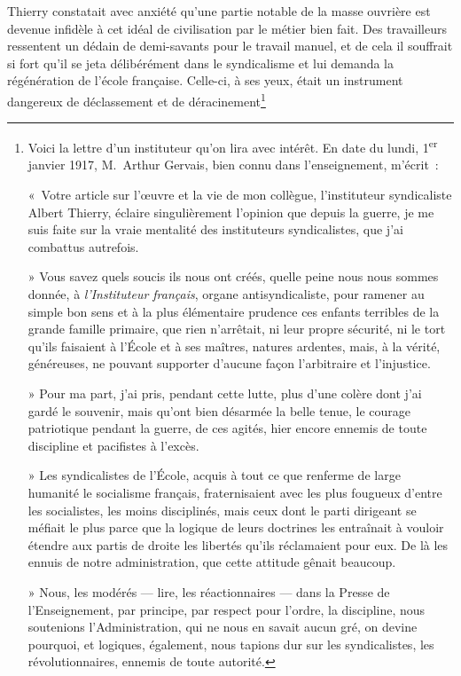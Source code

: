 \documentclass[french,twoside]{book} %
\begin{document}
Thierry constatait avec anxiété qu’une partie notable de la masse ouvrière est devenue infidèle à cet idéal de civilisation par le métier bien fait. Des travailleurs ressentent un dédain de demi-savants pour le travail manuel, et de cela il souffrait si fort qu’il se jeta délibérément dans le syndicalisme et lui demanda la régénération de l’école française. Celle-ci, à ses yeux, était un instrument dangereux de déclassement et de déracinement\footnote{\noindent Voici la lettre d’un instituteur qu’on lira avec intérêt. En date du lundi, 1\textsuperscript{er} janvier 1917, M. Arthur Gervais, bien connu dans l’enseignement, m’écrit :‌\par
 « Votre article sur l’œuvre et la vie de mon collègue, l’instituteur syndicaliste Albert Thierry, éclaire singulièrement l’opinion que depuis la guerre, je me suis faite sur la vraie mentalité des instituteurs syndicalistes, que j’ai combattus autrefois.‌\par
 » Vous savez quels soucis ils nous ont créés, quelle peine nous nous sommes donnée, à {\itshape l’Instituteur français}, organe antisyndicaliste, pour ramener au simple bon sens et à la plus élémentaire prudence ces enfants terribles de la grande famille primaire, que rien n’arrêtait, ni leur propre sécurité, ni le tort qu’ils faisaient à l’École et à ses maîtres, natures ardentes, mais, à la vérité, généreuses, ne pouvant supporter d’aucune façon l’arbitraire et l’injustice.‌\par
 » Pour ma part, j’ai pris, pendant cette lutte, plus d’une colère dont j’ai gardé le souvenir, mais qu’ont bien désarmée la belle tenue, le courage patriotique pendant la guerre, de ces agités, hier encore ennemis de toute discipline et pacifistes à l’excès.‌\par
 » Les syndicalistes de l’École, acquis à tout ce que renferme de large humanité le socialisme français, fraternisaient avec les plus fougueux d’entre les socialistes, les moins disciplinés, mais ceux dont le parti dirigeant se méfiait le plus parce que la logique de leurs doctrines les entraînait à vouloir étendre aux partis de droite les libertés qu’ils réclamaient pour eux. De là les ennuis de notre administration, que cette attitude gênait beaucoup.‌\par
 » Nous, les modérés — lire, les réactionnaires — dans la Presse de l’Enseignement, par principe, par respect pour l’ordre, la discipline, nous soutenions l’Administration, qui ne nous en savait aucun gré, on devine pourquoi, et logiques, également, nous tapions dur sur les syndicalistes, les révolutionnaires, ennemis de toute autorité.‌\par
}
\end{document}
